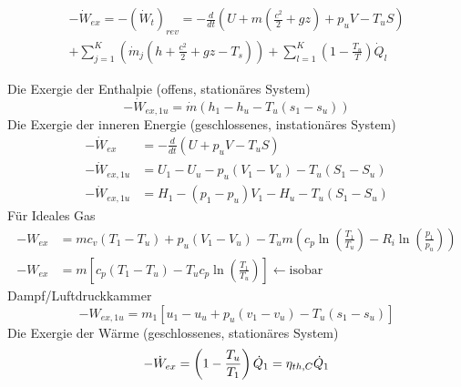 \documentclass[twocolumn]{article}
\begin{document}
\begin{multicols}{2}
\end{multicols}

\begin{multline*}
	-\dot{W}_{ex} = - (\dot{W}_t)_{rev} = -\frac{d}{dt} \left( U + m\left ( \frac{c^2}{2}+ gz \right) + p_uV - T_uS \right) \\  +  \sum_{j=1}^{K} \left(\dot{m}_j \left(h + \frac{c^2}{2} + gz -T_s \right) \right) + \sum_{l=1}^{K} \left( 1 - \frac{T_u}{T}\right) \dot{Q}_l 
\end{multline*}


Die Exergie der Enthalpie (offens, stationäres System)
\begin{equation*}
	-\dot{W}_{ex,1u} = \dot{m}(h_1 - h_u -T_u(s_1 - s_u))
\end{equation*}
Die Exergie der inneren Energie (geschlossenes, instationäres System)
\begin{align*}
	- \dot{W}_{ex} &= - \frac{d}{dt}(U + p_uV -T_uS) \\
	-\dot{W}_{ex,1u} &= U_1 - U_u -p_u(V_1 - V_u) - T_u(S_1 - S_u) \\
	-\dot{W}_{ex,1u} &= H_1 - (p_1-p_u)V_1 - H_u- T_u(S_1 - S_u)
\end{align*}
Für Ideales Gas \\
\begin{align*}
	-W_{ex} &= mc_v(T_1 -T_u) + p_u(V_1 - V_u) - T_um \left(c_p \ln \left(\frac{T_1}{T_u}\right) -R_i \ln \left(\frac{p_1}{p_u}\right)\right) \\
	-W_{ex} &= m \left[c_p(T_1 - T_u) -T_u c_p \ln \left(\frac{T_1}{T_u}\right)\right] \leftarrow \text{isobar}
\end{align*}
Dampf/Luftdruckkammer
\begin{equation*}
	-W_{ex,1u} = m_1 [ u_1 - u_u + p_u ( v_1 - v_u) - T_u(s_1 - s_u)]
\end{equation*}
Die Exergie der Wärme (geschlossenes, stationäres System)
\begin{equation*}
	- \dot{W}_{ex} = \left(1 - \frac{T_u}{T_1} \right) \dot{Q}_1 = \eta_{th,C} \dot{Q}_1 \\
\end{equation*}
\end{document}
